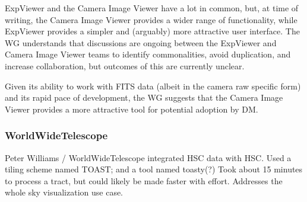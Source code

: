 ExpViewer and the Camera Image Viewer have a lot in common, but, at time of writing, the Camera Image Viewer provides a wider range of functionality, while ExpViewer provides a simpler and (arguably) more attractive user interface.
The WG understands that discussions are ongoing between the ExpViewer and Camera Image Viewer teams to identify commonalities, avoid duplication, and increase collaboration, but outcomes of this are currently unclear.

Given its ability to work with FITS data (albeit in the camera raw specific form) and its rapid pace of development, the WG suggests that the Camera Image Viewer provides a more attractive tool for potential adoption by DM.


\subsubsection{WorldWideTelescope}
Peter Williams / WorldWideTelescope integrated HSC data with HSC.
Used a tiling scheme named TOAST; and a tool named toasty(?)
Took about 15 minutes to process a tract, but could likely be made faster with effort.
Addresses the whole sky visualization use case.


